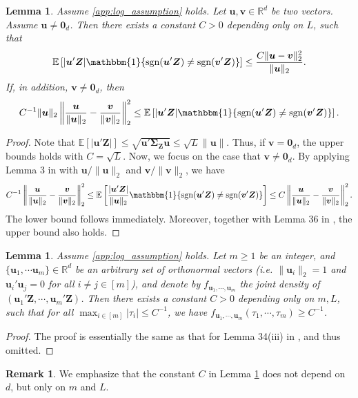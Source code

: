 \documentclass[aos,preprint]{imsart}
\theoremstyle{plain}
\newtheorem{lemma}[theorem]{Lemma}
\theoremstyle{definition}
\newtheorem{remark}{Remark}
\newcommand{\bd}[1]{\boldsymbol{#1}}
\newcommand{\idf}{\mathbbm{1}}
\newcommand{\bSigma}{\boldsymbol{\Sigma}}
\newcommand{\mR}{\mathbb{R}}
\newcommand{\bu}{\boldsymbol{u}}
\newcommand{\bv}{\boldsymbol{v}}
\newcommand{\bZ}{\boldsymbol{Z}}
\newcommand{\bR}{\mathbb{R}}
\newcommand{\Exp}{\mathbb{E}}
\begin{document}
\begin{appendix}
\begin{lemma}\label{lemma: estErr_to_regret}
Assume \eqref{app:log_assumption} holds. Let $\bu,\bv \in \bR^{d}$ be two vectors. Assume $\bu \neq \bd{0}_d$. Then there exists a constant $C>0$ depending only on $L$, such that
$$ \Exp\left[{|\bu'\bZ|} \idf\{\textup{sgn}(\bu'\bZ)\neq \textup{sgn}(\bv'\bZ) \} \right] \le \frac{C\|\bu-\bv\|_2^2}{\|\bu\|_2}.$$
If, in addition, $\bv \neq \bd{0}_d$, then
$$C^{-1}{\|\bu\|_2} \left\|\frac{\bu}{\|\bu\|_2}-\frac{\bv}{\|\bv\|_2} \right\|_2^2\le \Exp\left[{|\bu'\bZ|} \idf\{\textup{sgn}(\bu'\bZ)\neq \textup{sgn}(\bv'\bZ) \} \right].  $$
\end{lemma}
\begin{proof}
Note that $\Exp\left[{|\bu'\bZ|} \right]  \leq \sqrt{\bu'\bSigma_{\bZ} \bu}\leq \sqrt{L} \|\bu\|$. Thus, if $\bv = \bd{0}_d$,  the upper bounds holds with $C = \sqrt{L}$. 
Now, we focus on the case that $\bv \neq \bd{0}_d$. By applying Lemma 3 in \cite{song2022truncated} with  $\bu/\|\bu\|_2$ and $\bv/\|\bv\|_2$, we have
$$
C^{-1}\left\|\frac{\bu}{\|\bu\|_2}-\frac{\bv}{\|\bv\|_2} \right\|_2^2\le \Exp\left[\frac{|\bu'\bZ|}{\|\bu\|_2} \idf\{\textup{sgn}(\bu'\bZ)\neq \textup{sgn}(\bv'\bZ) \} \right] \le C\left\|\frac{\bu}{\|\bu\|_2}-\frac{\bv}{\|\bv\|_2} \right\|_2^2.
$$
The lower bound follows immediately. Moreover, together with Lemma 36 in \cite{song2022truncated}, the upper bound also holds.
\end{proof}

\begin{lemma}\label{lemma:density_props}
Assume \eqref{app:log_assumption} holds. Let $m \geq 1$ be an integer, and $\{\bu_1, \cdots \bu_m\} \in \mR^d$ be an arbitrary set of orthonormal vectors (i.e. 
$\|\bu_i\|_2=1$ and $\bu_i'\bu_j = 0$ for all $i\neq j\in[m]$), and denote by $f_{\bu_1,\cdots,\bu_m}$ the joint density of $(\bu_1'\bZ,\cdots,\bu_m'\bZ)$. Then there exists a constant $C > 0$ depending only on $m,L$, such that 
for all $\max_{i\in[m]}|\tau_i|\le C^{-1}$, we have
$f_{\bu_1,\cdots,\bu_m}(\tau_1,\cdots,\tau_m) \ge C^{-1}$.
\end{lemma}
\begin{proof}
    The proof is essentially the same as that for  Lemma 34(iii) in \cite{song2022truncated}, and thus omitted.
\end{proof}
\begin{remark}
We emphasize that the constant $C$ in Lemma \ref{lemma:density_props} does not depend on $d$, but only on $m$ and $L$.
\end{remark}



\end{appendix}
\end{document}
